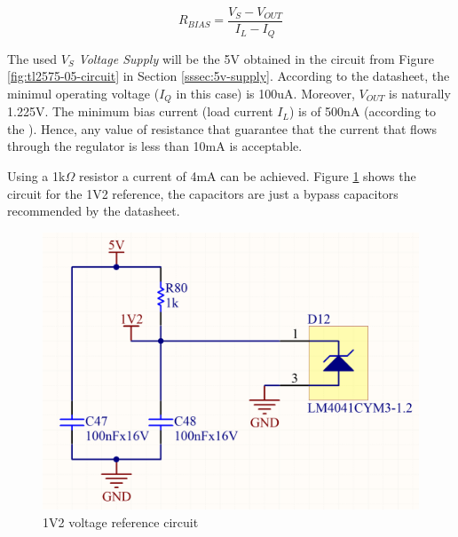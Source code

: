 			\begin{equation}\label{eqn:rbis-adr510}
				R_{BIAS} = \frac{V_{S} - V_{OUT}}{I_{L} - I_{Q}}
			\end{equation}

			The used $V_{S}$ \textit{Voltage Supply} will be the 5V obtained in the circuit from Figure \ref{fig:tl2575-05-circuit} in Section \ref{sssec:5v-supply}. According to the datasheet, the minimul operating voltage ($I_{Q}$ in this case) is 100uA. Moreover, $V_{OUT}$ is naturally 1.225V. The minimum bias current (load current $I_{L}$) is of 500nA (according to the \cite{lm2907-datasheet}). Hence, any value of resistance that guarantee that the current that flows through the regulator is less than 10mA is acceptable.
			\par
			Using a 1k$\Omega$ resistor a current of 4mA can be achieved. Figure \ref{fig:1v2-circuit} shows the circuit for the 1V2 reference, the capacitors are just a bypass capacitors recommended by the datasheet.

			\begin{figure}[htbp]
				\centering
				\includegraphics[width=.6\textwidth]{figuras/fig-1v2-circuit}
				\caption{1V2 voltage reference circuit}
				\label{fig:1v2-circuit}
			\end{figure}	 
